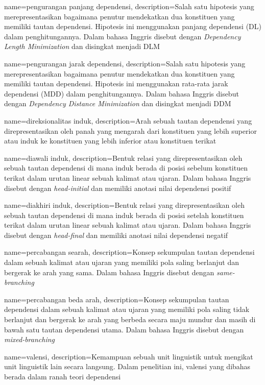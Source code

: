 {
    name=pengurangan panjang dependensi,
    description={Salah satu hipotesis yang merepresentasikan bagaimana penutur mendekatkan dua konstituen yang memiliki tautan dependensi. Hipotesis ini menggunakan panjang dependensi (DL) dalam penghitungannya. Dalam bahasa Inggris disebut dengan \textit{Dependency Length Minimization} dan disingkat menjadi DLM}
}

{
    name=pengurangan jarak dependensi,
    description={Salah satu hipotesis yang merepresentasikan bagaimana penutur mendekatkan dua konstituen yang memiliki tautan dependensi. Hipotesis ini menggunakan rata-rata jarak dependensi (MDD) dalam penghitungannya. Dalam bahasa Inggris disebut dengan \textit{Dependency Distance Minimization} dan disingkat menjadi DDM}
}

{
    name=direksionalitas induk,
    description={Arah sebuah tautan dependensi yang direpresentasikan oleh panah yang mengarah dari konstituen yang lebih superior atau induk ke konstituen yang lebih inferior atau konstituen terikat}
}

{
    name=diawali induk,
    description={Bentuk relasi yang direpresentasikan oleh sebuah tautan dependensi di mana induk berada di posisi sebelum konstituen terikat dalam urutan linear sebuah kalimat atau ujaran. Dalam bahasa Inggris disebut dengan \textit{head-initial} dan memiliki anotasi nilai dependensi positif}
}

{
    name=diakhiri induk,
    description={Bentuk relasi yang direpresentasikan oleh sebuah tautan dependensi di mana induk berada di posisi setelah konstituen terikat dalam urutan linear sebuah kalimat atau ujaran. Dalam bahasa Inggris disebut dengan \textit{head-final} dan memiliki anotasi nilai dependensi negatif}
}

{
    name=percabangan searah,
    description={Konsep sekumpulan tautan dependensi dalam sebuah kalimat atau ujaran yang memiliki pola saling berlanjut dan bergerak ke arah yang sama. Dalam bahasa Inggris disebut dengan \textit{same-branching}}
}

{
    name=percabangan beda arah,
    description={Konsep sekumpulan tautan dependensi dalam sebuah kalimat atau ujaran yang memiliki pola saling tidak berlanjut dan bergerak ke arah yang berbeda secara maju mundur dan masih di bawah satu tautan dependensi utama. Dalam bahasa Inggris disebut dengan \textit{mixed-branching}}
}

{
    name=valensi,
    description={Kemampuan sebuah unit linguistik untuk mengikat unit linguistik lain secara langsung. Dalam penelitian ini, valensi yang dibahas berada dalam ranah teori dependensi}
}
